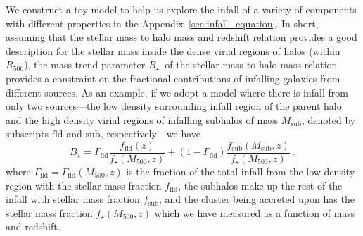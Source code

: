 \documentclass[useAMS,usenatbib,iop,numberedappendix]{mn2e}
\newcommand{\Rfiveoo}{\ensuremath{R_{500}}}
\newcommand{\Mfiveoo}{\ensuremath{M_{500}}}
\newcommand{\Mfiveoosub}{\ensuremath{M_{\mathrm{sub}}}}
\newcommand{\redshift}{\ensuremath{z}}
\newcommand{\Bstar}{\ensuremath{B_{\star}}}
\newcommand{\fstar}{\ensuremath{f_{\star}}}
\begin{document}
We construct a toy model to help us explore the infall of a variety of components with different properties in the Appendix~\ref{sec:infall_equation}.
In short, assuming that the stellar mass to halo mass and redshift relation provides a good description for the stellar mass inside the dense virial regions of halos (within \Rfiveoo), the mass trend parameter \Bstar\ of the stellar mass to halo mass relation provides a constraint on the fractional contributions of infalling galaxies from different sources.
As an example, if we adopt a model where there is infall from only two sources---the low density surrounding infall region of the parent halo and the high density virial regions of infalling subhalos of mass \Mfiveoosub, denoted by subscripts $\mathrm{fld}$ and $\mathrm{sub}$, respectively---we have 
%
\begin{equation}
\label{eq:infall}
\Bstar = 
\Gamma_{\mathrm{fld}}
\frac{ f_{\mathrm{fld}}(\redshift) }{  
\fstar(\Mfiveoo, \redshift) } + 
\left(1 - \Gamma_{\mathrm{fld}} \right)
\frac{f_\mathrm{sub}(\Mfiveoosub,\redshift) }{  
\fstar(\Mfiveoo, \redshift) }
\, ,
\end{equation}
%
where $\Gamma_{\mathrm{fld}} = \Gamma_{\mathrm{fld}}(\Mfiveoo, \redshift)$
is the fraction of the total infall from the low density region with the stellar mass fraction $f_{\mathrm{fld}}$, the subhalos make up the rest of the infall with stellar mass fraction $f_\mathrm{sub}$, and the cluster being accreted upon has the stellar mass fraction $\fstar(\Mfiveoo, \redshift)$ which we have measured as a function of mass and redshift.
\end{document}
